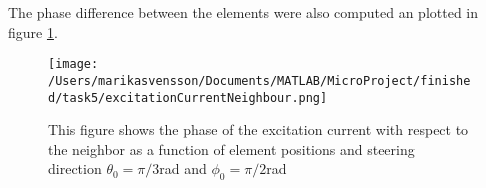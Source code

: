 The phase difference between the elements were also computed an plotted in figure \ref{task5:phaseNeigh}.

\begin{figure}[h]
\centering
\texttt{[image: /Users/marikasvensson/Documents/MATLAB/MicroProject/finished/task5/excitationCurrentNeighbour.png]}
\caption{This figure shows the phase of the excitation current with respect to the neighbor as a function of element positions and steering direction $\theta_0 = \pi/3$rad and $\phi_0 = \pi/2$rad }
\label{task5:phaseNeigh}
\end{figure}




\begin{comment}
\begin{equation}
\Psi_n = \frac{2\pi}{\lambda}( d_n sin(\theta_0) )
\end{equation}
where $\theta_0$ is the scanning angle and $\d_n = |\mathbf{r}_n - \mathbf{r}_{n-1}|$ is the intermediate distance between element n and n-1. 



The total phase shift for an element should then be 
\begin{equation}
\phi_n^{tot} = \sum_{i=1}^n \Psi_i.
\end{equation} 
For the amplitude we may use the formula we will set the current amplitude to 1. 





A steering vector $\mathbf{v(k)}$ is the representation of the phase delay that each element in the array antenna has, which is defined as 

\begin{equation}
\mathbf{v(k)}=[e^{-j\mathbf{k}\cdot\mathbf{r}_1} ... e^{-j\mathbf{k}\cdot\mathbf{r}_N} ]
\end{equation}
We can write an output function Y as 

\begin{equation}
R_A = R(\theta, \phi) \sum_i w_ie^{-j\mathbf{k}\cdot\mathbf{r}_i} = G(\theta, \phi)AF
\end{equation}
where

\begin{equation}
AF = \mathbb{w}^T\mathbf{v(k)}
\end{equation}
and  $R(\theta, \phi)$
\if
\end{comment}

